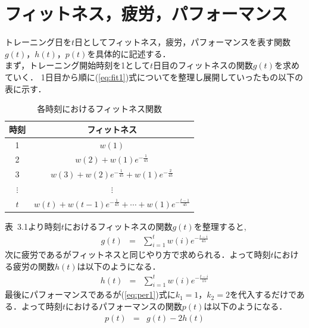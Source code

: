 \documentclass[12pt,fleqn]{jreport}
\begin{document}
\section{フィットネス，疲労，パフォーマンス}
トレーニング日を$t$日としてフィットネス，疲労，パフォーマンスを表す関数$g(t)$，$h(t)$，$p(t)$を具体的に記述する．\\
まず，トレーニング開始時刻を1として$t$日目のフィットネスの関数$g(t)$を求めていく．
1日目から順に(\ref{eq:fit1})式についてを整理し展開していったもの以下の表に示す．
\begin{longtable}{|c|c|}
  \caption{各時刻におけるフィットネス関数}                                 \\
  \hline
  時刻     & フィットネス                                                  \\
  \hline
  1        & $w(1)$                                                        \\
  \hline
  2        & $w(2)+w(1)e^{-\frac{1}{45}}$                                  \\
  \hline
  3        & $w(3)+w(2)e^{-\frac{1}{45}}+w(1)e^{-\frac{2}{45}}$            \\
  \hline
  $\vdots$ & $\vdots$                                                      \\
  \hline
  $t$      & $w(t)+w(t-1)e^{-\frac{1}{45}}+\cdots+w(1)e^{-\frac{t-1}{45}}$ \\
  \hline
\end{longtable}
表\ 3.1より時刻$t$におけるフィットネスの関数$g(t)$を整理すると,
\begin{eqnarray}
  g(t)&=&\sum_{i=1}^t w(i)e^{-\frac{t-i}{45}}\label{eq:fit2}%
\end{eqnarray}
次に疲労であるがフィットネスと同じやり方で求められる．よって時刻$t$における疲労の関数$h(t)$は以下のようになる．
\begin{eqnarray}
  h(t)&=&\sum_{i=1}^t w(i)e^{-\frac{t-i}{15}}\label{eq:fig2}%
\end{eqnarray}
最後にパフォーマンスであるが(\ref{eq:per1})式に$k_1=1$，$k_2=2$を代入するだけである．よって時刻$t$におけるパフォーマンスの関数$p(t)$は以下のようになる．
\begin{eqnarray}
  p(t)&=&g(t)-2h(t)\label{eq:per2}%
\end{eqnarray}
\vspace{1cm}
\end{document}
